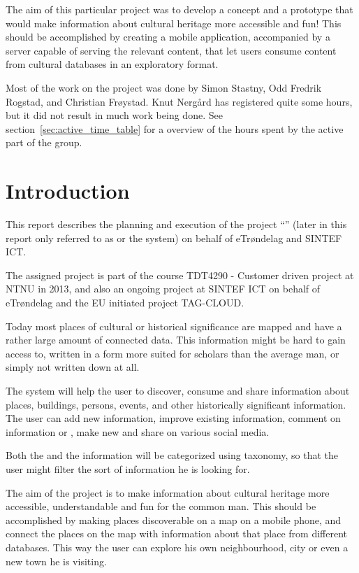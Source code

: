 \documentclass[11pt]{book}
\begin{document}
The aim of this particular project was to develop a concept and a prototype that would make information about cultural heritage more accessible and fun! This should be accomplished by creating a mobile application, accompanied by a server capable of serving the relevant content, that let users consume content from cultural databases in an exploratory format.

Most of the work on the project was done by Simon Stastny, Odd Fredrik Rogstad, and Christian Frøystad. Knut Nergård has registered quite some hours, but it did not result in much work being done. See section~\ref{sec:active_time_table} for a overview of the hours spent by the active part of the group.

\tableofcontents
\listoffigures
\listoftables
\glsaddall
{}
\printglossaries

\mainmatter
\chapter{Introduction}
This report describes the planning and execution of the project ``\fullprojectname'' (later in this report only referred to as \shortprojectname or the system) on behalf of eTrøndelag and SINTEF ICT.

The assigned project is part of the course TDT4290 - Customer driven project at NTNU in 2013, and also an ongoing project at SINTEF ICT on behalf of eTrøndelag and the EU initiated project TAG-CLOUD.

Today most places of cultural or historical significance are mapped and have a rather large amount of connected data. This information might be hard to gain access to, written in a form more suited for scholars than the average man, or simply not written down at all.

The system will help the user to discover, consume and share information about places, buildings, persons, events, and other historically significant information. The user can add new information, improve existing information, comment on information or \wallentityp, make new \wallentityp and share \wallentityp on various social media.

Both the \wallentityp and the information will be categorized using taxonomy, so that the user might filter the sort of information he is looking for.

The aim of the project is to make information about cultural heritage more accessible, understandable and fun for the common man. This should be accomplished by making places discoverable on a map on a mobile phone, and connect the places on the map with information about that place from different databases. This way the user can explore his own neighbourhood, city or even a new town he is visiting.
\end{document}
